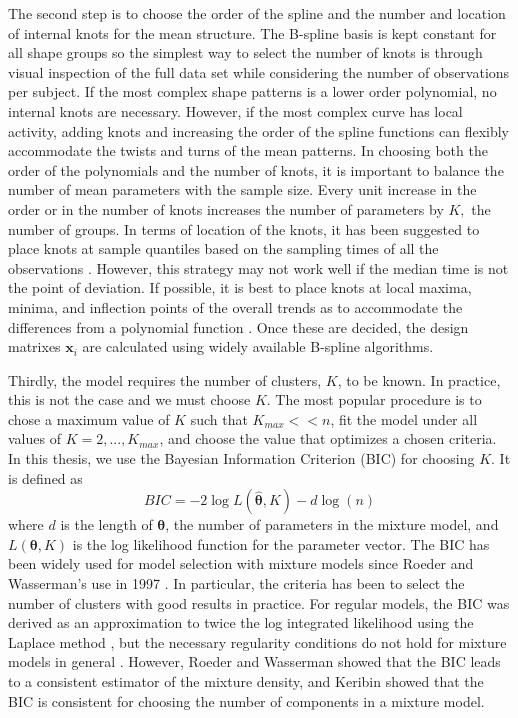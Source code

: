 \documentclass[12pt]{article}
\newcommand{\B}[0]{\mathbf}
\newcommand{\bs}[0]{\boldsymbol}
\begin{document}
The second step is to choose the order of the spline and the number and location of internal knots for the mean structure. The B-spline basis is kept constant for all shape groups so the simplest way to select the number of knots is through visual inspection of the full data set while considering the number of observations per subject. If the most complex shape patterns is a lower order polynomial, no internal knots are necessary. However, if the most complex curve has local activity, adding knots and increasing the order of the spline functions can flexibly accommodate the twists and turns of the mean patterns. In choosing both the order of the polynomials and the number of knots, it is important to balance the number of mean parameters with the sample size. Every unit increase in the order or in the number of knots increases the number of parameters by $K,$ the number of groups. In terms of location of the knots, it has been suggested to place knots at sample quantiles based on the sampling times of all the observations \cite{ruppert2002}. However, this strategy may not work well if the median time is not the point of deviation. If possible, it is best to place knots at local maxima, minima, and inflection points of the overall trends as to accommodate the differences from a polynomial function \cite{eubank1999}.  Once these are decided, the design matrixes $\B x_{i}$ are calculated using widely available B-spline algorithms. 

Thirdly, the model requires the number of clusters, $K$, to be known. In practice, this is not the case and we must choose $K$. The most popular procedure is to chose a maximum value of $K$ such that $K_{max}<<n$, fit the model under all values of $K=2,...,K_{max}$, and choose the value that optimizes a chosen criteria. In this thesis, we use the Bayesian Information Criterion (BIC) \cite{schwarz1978} for choosing $K$. It is defined as
$$BIC = -2\log L(\hat{\bs\theta},K)- d\log(n)$$
where $d$ is the length of $\bs\theta$, the number of parameters in the mixture model, and $L(\bs\theta,K)$ is the log likelihood function for the parameter vector. The BIC has been widely used for model selection with mixture models since Roeder and Wasserman's use in 1997 \cite{roeder1997}. In particular, the criteria has been to select the number of clusters \cite{dasgupta1999,fraley1999} with good results in practice. For regular models, the BIC was derived as an approximation to twice the log integrated likelihood using the Laplace method \cite{tierney1986}, but the necessary regularity conditions do not hold for mixture models in general \cite{aitkin1985}. However, Roeder and Wasserman \cite{roeder1997} showed that the BIC leads to a consistent estimator of the mixture density, and Keribin \cite{keribin2000} showed that the BIC is consistent for choosing the number of components in a mixture model.
\end{document}
